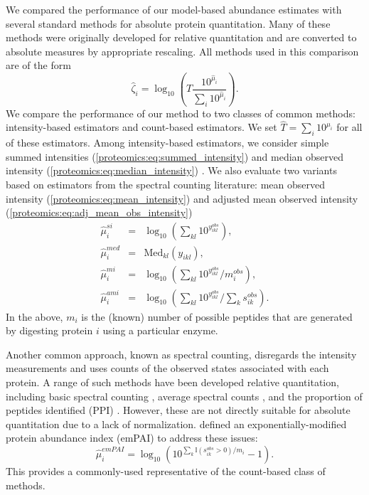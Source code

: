 We compared the performance of our model-based abundance estimates with several standard methods for absolute protein quantitation.
Many of these methods were originally developed for relative quantitation and are converted to absolute measures by appropriate rescaling.
All methods used in this comparison are of the form
\begin{equation}
 \hat{\zeta}_i = \log_{10}\left( \hat{T} \frac{10^{\hat{\mu}_i}}{\sum_i 10^{\hat{\mu}_i}} \right) .
\end{equation}
%
We compare the performance of our method to two classes of common methods: intensity-based estimators and count-based estimators.
We set $\hat{T} = \sum_i 10^{\mu_i}$ for all of these estimators.
Among intensity-based estimators, we consider simple summed intensities  (\ref{proteomics:eq:summed_intensity}) and median observed intensity  (\ref{proteomics:eq:median_intensity}) \citep[e.g.,][]{Cox:2008uu}.
We also evaluate two variants based on estimators from the spectral counting literature: mean observed intensity (\ref{proteomics:eq:mean_intensity}) and adjusted mean observed intensity (\ref{proteomics:eq:adj_mean_obs_intensity})
\begin{eqnarray}
\hat \mu_{i}^{si} &=& \log_{10} \left( \sum_{kl} 10^{y^{obs}_{ikl}} \right),
\label{proteomics:eq:summed_intensity} \\
\hat \mu_{i}^{med} &=& \text{Med}_{kl}(y_{ikl}),
\label{proteomics:eq:median_intensity} \\
\hat \mu_{i}^{mi} &=& \log_{10}\left( \sum_{kl} 10^{y^{obs}_{ikl}}/m_i^{obs} \right),
\label{proteomics:eq:mean_intensity} \\
\hat \mu_{i}^{ami} &=& \log_{10}\left( \sum_{kl} 10^{y^{obs}_{ikl}}/\sum_{k} s^{obs}_{ik} \right) .
\label{proteomics:eq:adj_mean_obs_intensity}
\end{eqnarray}
%
In the above, $m_i$ is the (known) number of possible peptides that are generated by digesting protein $i$ using a particular enzyme.

Another common approach, known as spectral counting, disregards the intensity measurements and uses counts of the observed states associated with each protein.
A range of such methods have been developed relative quantitation, including basic spectral counting \citep[e.g.,][]{Liu:2004hv}, average spectral counts \citep[e.g.,][]{Weiss:2010ik}, and the proportion of peptides identified (PPI) \citep{Rappsilber2002}.
However, these are not directly suitable for absolute quantitation due to a lack of normalization.
\citet{Ishihama:2005ir} defined an exponentially-modified protein abundance index (emPAI) to address these issues:
%
\begin{equation}
\hat \mu_{i}^{emPAI} = \log_{10}\left( 10^{\sum_k \mathbb{I}(s_{ik}^{obs} > 0) / m_i } - 1 \right) .
\label{proteomics:eq:empai}
\end{equation}
This provides a commonly-used representative of the count-based class of methods.

